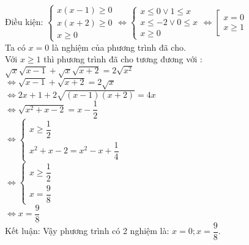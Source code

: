 \begin{Answer}{6}
Điều kiện: $ \begin{cases}
    x(x-1 ) \geq 0 \\
    x(x+2 ) \geq 0 \\
    x \geq 0
\end{cases}
\Leftrightarrow \begin{cases}
    x \leq 0 \vee 1 \leq x \\
    x \leq -2  \vee 0 \leq x \\
    x \geq 0
\end{cases}
\Leftrightarrow  \left[
    \begin{array}{l}
        x =0 \\
        x \geq 1
    \end{array}
\right. $ \\
Ta có $ x=0 $ là nghiệm của phương trình đã cho.\\
Với $ x \geq 1 $ thì phương trình đã cho tương đương với : \\
$ \sqrt{x } \sqrt{x-1 } + \sqrt{x } \sqrt{x+2 } = 2 \sqrt{x^2}     $ \\
$ \Leftrightarrow \sqrt{x-1 } + \sqrt{x +2 } = 2 \sqrt{x}    $ \\
$ \Leftrightarrow 2x + 1 + 2 \sqrt{(x-1)(x+2)} = 4x $ \\
$ \Leftrightarrow \sqrt{x^2 +x -2 } = x - \dfrac{1 }{2 }  $ \\
$ \Leftrightarrow \begin{cases}
    x \geq \dfrac{1}{2 } \\
    x^2 +x -2 = x^2 -x + \dfrac{1 }{4 }
\end{cases} $ \\
$ \Leftrightarrow
\begin{cases}
    x \geq \dfrac{1 }{2}   \\
    x = \dfrac{9 }{8}
\end{cases} $ \\
$ \Leftrightarrow x =\dfrac{9}{8}   $ \\

Kết luận: Vậy phương trình có 2 nghiệm là: $ x=0 ; x=\dfrac{9}{8}    $.

\end{Answer}

